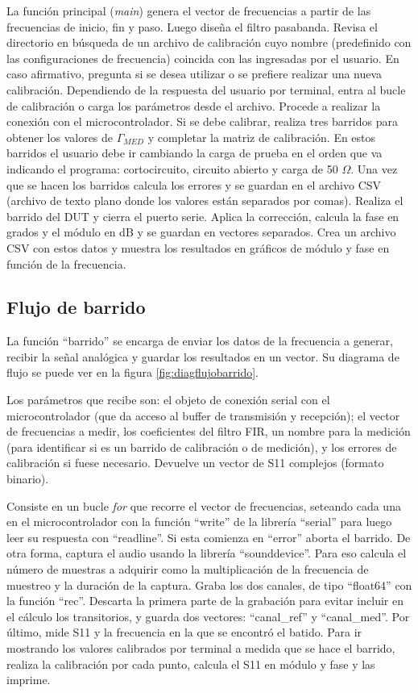 La función principal (\textit{main}) genera el vector de frecuencias a partir de las frecuencias de inicio, fin y paso. Luego diseña el filtro pasabanda. Revisa el directorio en búsqueda de un archivo de calibración cuyo nombre (predefinido con las configuraciones de frecuencia) coincida con las ingresadas por el usuario. En caso afirmativo, pregunta si se desea utilizar o se prefiere realizar una nueva calibración. Dependiendo de la respuesta del usuario por terminal, entra al bucle de calibración o carga los parámetros desde el archivo. Procede a realizar la conexión con el microcontrolador. Si se debe calibrar, realiza tres barridos para obtener los valores de $\Gamma_{MED}$ y completar la matriz de calibración. En estos barridos el usuario debe ir cambiando la carga de prueba en el orden que va indicando el programa: cortocircuito, circuito abierto y carga de 50 $\Omega$. Una vez que se hacen los barridos calcula los errores y se guardan en el archivo CSV (archivo de texto plano donde los valores están separados por comas). Realiza el barrido del DUT y cierra el puerto serie. Aplica la corrección, calcula la fase en grados y el módulo en dB y se guardan en vectores separados. Crea un archivo CSV con estos datos y muestra los resultados en gráficos de módulo y fase en función de la frecuencia. 

\subsection{Flujo de barrido}

La función ``barrido'' se encarga de enviar los datos de la frecuencia a generar, recibir la señal analógica y guardar los resultados en un vector. Su diagrama de flujo se puede ver en la figura \ref{fig:diagflujobarrido}.

Los parámetros que recibe son: el objeto de conexión serial con el microcontrolador (que da acceso al buffer de transmisión y recepción); el vector de frecuencias a medir, los coeficientes del filtro FIR, un nombre para la medición (para identificar si es un barrido de calibración o de medición), y los errores de calibración si fuese necesario. Devuelve un vector de S11 complejos (formato binario).

Consiste en un bucle \textit{for} que recorre el vector de frecuencias, seteando cada una en el microcontrolador con la función ``write'' de la librería ``serial'' para luego leer su respuesta con ``readline''. Si esta comienza en ``error'' aborta el barrido. De otra forma, captura el audio usando la librería ``sounddevice''. Para eso calcula el número de muestras a adquirir como la multiplicación de la frecuencia de muestreo y la duración de la captura. Graba los dos canales, de tipo ``float64'' con la función ``rec''. Descarta la primera parte de la grabación para evitar incluir en el cálculo los transitorios, y guarda dos vectores: ``canal\_ref'' y ``canal\_med''. Por último, mide S11 y la frecuencia en la que se encontró el batido. Para ir mostrando los valores calibrados por terminal a medida que se hace el barrido, realiza la calibración por cada punto, calcula el S11 en módulo y fase y las imprime. 

